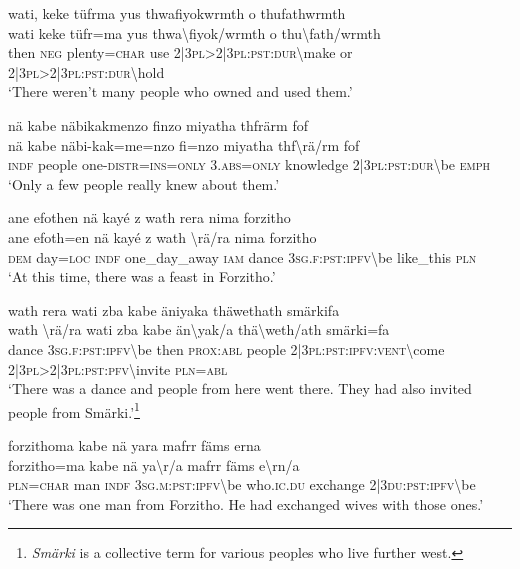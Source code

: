 \ea\label{ex:11:a2485}
wati, keke tüfrma yus thwafiyokwrmth o thufathwrmth\\
\gll wati	keke	tüfr=ma	yus	thwa{\textbackslash}fiyok/wrmth	o	thu{\textbackslash}fath/wrmth\\
     then	\textsc{neg}	plenty=\textsc{char}	use	2|3\textsc{pl}>2|3\textsc{pl}:\textsc{pst}:\textsc{dur}{\textbackslash}make	or	2|3\textsc{pl}>2|3\textsc{pl}:\textsc{pst}:\textsc{dur}{\textbackslash}hold\\
\glt `There weren't many people who owned and used them.'
\z

\ea\label{ex:11:a2487}
nä kabe näbikakmenzo finzo miyatha thfrärm fof\\
\gll nä	kabe	näbi-kak=me=nzo	fi=nzo	miyatha	thf{\textbackslash}rä/rm	fof\\
     \textsc{indf}	people	one-\textsc{distr}=\textsc{ins}=\textsc{only}	3.\textsc{abs}=\textsc{only}	knowledge	2|3\textsc{pl}:\textsc{pst}:\textsc{dur}{\textbackslash}be	\textsc{emph}\\
\glt `Only a few people really knew about them.'
\z

\ea\label{ex:11:a2488}
ane efothen nä kayé z wath rera nima forzitho\\
\gll ane	efoth=en	nä	kayé	z	wath	{\textbackslash}rä/ra	nima	forzitho\\
     \textsc{dem}	day=\textsc{loc}	\textsc{indf}	one\_day\_away	\textsc{iam}	dance	3\textsc{sg}.\textsc{f}:\textsc{pst}:\textsc{ipfv}{\textbackslash}be	like\_this	\textsc{pln}\\
\glt `At this time, there was a feast in Forzitho.'
\z

\ea\label{ex:11:a2489}
wath rera wati zba kabe äniyaka thäwethath smärkifa\\
\gll wath	{\textbackslash}rä/ra	wati	zba	kabe	än{\textbackslash}yak/a	thä{\textbackslash}weth/ath	smärki=fa\\
     dance	3\textsc{sg}.\textsc{f}:\textsc{pst}:\textsc{ipfv}{\textbackslash}be	then	\textsc{prox}:\textsc{abl}	people	2|3\textsc{pl}:\textsc{pst}:\textsc{ipfv}:\textsc{vent}{\textbackslash}come	2|3\textsc{pl}>2|3\textsc{pl}:\textsc{pst}:\textsc{pfv}{\textbackslash}invite	\textsc{pln}=\textsc{abl}\\
\glt `There was a dance and people from here went there. They had also invited people from Smärki.'\footnote{\textit{Smärki} is a collective term for various peoples who live further west.}
\z

\ea\label{ex:11:a2491}
forzithoma kabe nä yara mafrr fäms erna\\
\gll forzitho=ma	kabe	nä	ya{\textbackslash}r/a	mafrr	fäms	e{\textbackslash}rn/a\\
     \textsc{pln}=\textsc{char}	man	\textsc{indf}	3\textsc{sg}.\textsc{m}:\textsc{pst}:\textsc{ipfv}{\textbackslash}be	who.\textsc{ic}.\textsc{du}	exchange	2|3\textsc{du}:\textsc{pst}:\textsc{ipfv}{\textbackslash}be\\
\glt `There was one man from Forzitho. He had exchanged wives with those ones.'
\z

